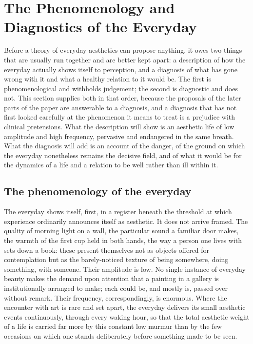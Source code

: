 \section{The Phenomenology and Diagnostics of the Everyday}
\label{p23:sec:diagnostics}

\noindent
Before a theory of everyday aesthetics can propose anything, it owes two things that are usually run together and are better kept apart: a description of how the everyday actually shows itself to perception, and a diagnosis of what has gone wrong with it and what a healthy relation to it would be. The first is phenomenological and withholds judgement; the second is diagnostic and does not. This section supplies both in that order, because the proposals of the later parts of the paper are answerable to a diagnosis, and a diagnosis that has not first looked carefully at the phenomenon it means to treat is a prejudice with clinical pretensions. What the description will show is an aesthetic life of low amplitude and high frequency, pervasive and endangered in the same breath. What the diagnosis will add is an account of the danger, of the ground on which the everyday nonetheless remains the decisive field, and of what it would be for the dynamics of a life and a relation to be well rather than ill within it.

\subsection{The phenomenology of the everyday}
\label{p23:sub:diag-phenomenology}

The everyday shows itself, first, in a register beneath the threshold at which experience ordinarily announces itself as aesthetic. It does not arrive framed. The quality of morning light on a wall, the particular sound a familiar door makes, the warmth of the first cup held in both hands, the way a person one lives with sets down a book: these present themselves not as objects offered for contemplation but as the barely-noticed texture of being somewhere, doing something, with someone. Their amplitude is low. No single instance of everyday beauty makes the demand upon attention that a painting in a gallery is institutionally arranged to make; each could be, and mostly is, passed over without remark. Their frequency, correspondingly, is enormous. Where the encounter with art is rare and set apart, the everyday delivers its small aesthetic events continuously, through every waking hour, so that the total aesthetic weight of a life is carried far more by this constant low murmur than by the few occasions on which one stands deliberately before something made to be seen.

